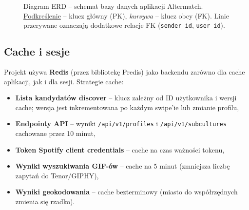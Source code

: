 \documentclass[12pt,a4paper]{article}
\begin{document}
\begin{figure}[H]
{%
}
\caption{Diagram ERD -- schemat bazy danych aplikacji Altermatch. \underline{Podkreślenie} -- klucz główny (PK), \textit{kursywa} -- klucz obcy (FK). Linie przerywane oznaczają dodatkowe relacje FK (\texttt{sender\_id}, \texttt{user\_id}).}
\label{fig:erd}
\end{figure}

\subsection{Cache i sesje}

Projekt używa \textbf{Redis} (przez bibliotekę Predis) jako backendu zarówno dla cache aplikacji, jak i dla sesji. Strategie cache:

\begin{itemize}
    \item \textbf{Lista kandydatów discover} -- klucz zależny od ID użytkownika i wersji cache; wersja jest inkrementowana po każdym swipe'ie lub zmianie profilu,
    \item \textbf{Endpointy API} -- wyniki \texttt{/api/v1/profiles} i \texttt{/api/v1/subcultures} cachowane przez 10 minut,
    \item \textbf{Token Spotify client credentials} -- cache na czas ważności tokenu,
    \item \textbf{Wyniki wyszukiwania GIF-ów} -- cache na 5 minut (zmniejsza liczbę zapytań do Tenor/GIPHY),
    \item \textbf{Wyniki geokodowania} -- cache bezterminowy (miasto do współrzędnych zmienia się rzadko).
\end{itemize}
\end{document}
